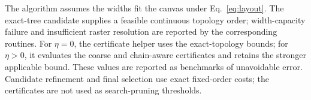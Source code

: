 \documentclass{vgtc}                %
\begin{document}
The algorithm assumes the widths fit the canvas under Eq.~\ref{eq:layout}. The exact-tree candidate supplies a feasible continuous topology order; width-capacity failure and insufficient raster resolution are reported by the corresponding routines. For $\eta=0$, the certificate helper uses the exact-topology bounds; for $\eta>0$, it evaluates the coarse and chain-aware certificates and retains the stronger applicable bound. These values are reported as benchmarks of unavoidable error. Candidate refinement and final selection use exact fixed-order costs; the certificates are not used as search-pruning thresholds.


\begin{algorithm}[htbp]
\caption{Width-Aware Refinement of One Candidate Structure}\label{alg:refine}
\end{algorithm}
\end{document}
